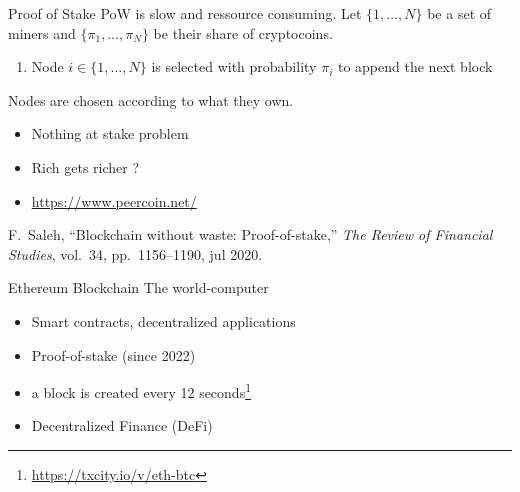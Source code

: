 \documentclass{beamer}
\begin{document}
\begin{frame}{Proof of Stake}
PoW is slow and ressource consuming. Let $\{1,\ldots, N\}$ be a set of miners and $\{\pi_1,\ldots, \pi_N\}$ be their share of cryptocoins.
\begin{tcolorbox}[enhanced,drop shadow, title=PoS]
\begin{enumerate}
\item Node $i\in \{1,\ldots, N\}$ is selected with probability $\pi_i$ to append the next block
\end{enumerate}
\end{tcolorbox}
\vspace{0.3cm}
Nodes are chosen according to what they own.
\begin{itemize}
  \item Nothing at stake problem
  \item Rich gets richer ? 
  \item \url{https://www.peercoin.net/}
\end{itemize}
\footnotesize{
\begin{thebibliography}{1}
F.~Saleh, ``Blockchain without waste: Proof-of-stake,'' {\em The Review of
  Financial Studies}, vol.~34, pp.~1156--1190, jul 2020.
\end{thebibliography}}
\end{frame}
\begin{frame}{Ethereum Blockchain}
The world-computer
\begin{itemize}
  \item Smart contracts, decentralized applications
  \item Proof-of-stake (since 2022)
  \item a block is created every 12 seconds\footnote{\url{https://txcity.io/v/eth-btc}}
  \item Decentralized Finance (DeFi)

\end{itemize}
\end{frame}


\end{document}
